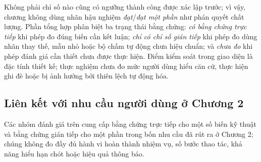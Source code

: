 Không phải chỉ số nào cũng có ngưỡng thành công được xác lập trước; vì vậy, chương không dùng nhãn hậu nghiệm \textit{đạt}/\textit{đạt một phần} như phán quyết chất lượng. Phần tổng hợp phân biệt ba trạng thái bằng chứng: \textit{có bằng chứng trực tiếp} khi phép đo đúng biến cần kết luận; \textit{chỉ có chỉ số gián tiếp} khi phép đo dùng nhãn thay thế, mẫu nhỏ hoặc bộ chấm tự động chưa hiệu chuẩn; và \textit{chưa đo} khi phép đánh giá cần thiết chưa được thực hiện. Điểm kiểm soát trong giao diện là đặc tính thiết kế; thực nghiệm chưa đo mức người dùng hiểu căn cứ, thực hiện ghi đè hoặc bị ảnh hưởng bởi thiên lệch tự động hóa.

\subsection{Liên kết với nhu cầu người dùng ở Chương 2}

Các nhóm đánh giá trên cung cấp bằng chứng trực tiếp cho một số biến kỹ thuật và bằng chứng gián tiếp cho một phần trong bốn nhu cầu đã rút ra ở Chương 2; chúng không đo đầy đủ hành vi hoàn thành nhiệm vụ, số bước thao tác, khả năng hiểu hạn chót hoặc hiệu quả thông báo.

